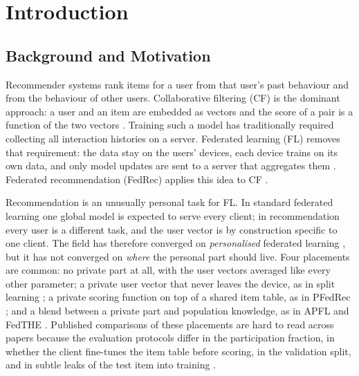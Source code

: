\chapter{Introduction}
\label{ch:introduction}

\section{Background and Motivation}
\label{sec:intro-background}

Recommender systems rank items for a user from that user's past behaviour and from the
behaviour of other users. Collaborative filtering (CF) is the dominant approach: a user and an
item are embedded as vectors and the score of a pair is a function of the two vectors
\cite{rendle2009bpr,he2017ncf}. Training such a model has traditionally required collecting all
interaction histories on a server. Federated learning (FL) removes that requirement: the data
stay on the users' devices, each device trains on its own data, and only model updates are sent
to a server that aggregates them \cite{mcmahan2017fedavg,kairouz2021advances}. Federated
recommendation (FedRec) applies this idea to CF
\cite{ammaduddin2019fcf,chai2021fedmf,zhang2025survey}.

Recommendation is an unusually personal task for FL. In standard federated learning one global
model is expected to serve every client; in recommendation every user is a different task, and
the user vector is by construction specific to one client. The field has therefore converged on
\emph{personalised} federated learning \cite{arivazhagan2019fedper,deng2020apfl,collins2021fedrep},
but it has not converged on \emph{where} the personal part should live. Four placements are
common: no private part at all, with the user vectors averaged like every other parameter; a
private user vector that never leaves the device, as in split learning
\cite{singhal2021fedrecon}; a private scoring function on top of a shared item table, as in
PFedRec \cite{zhang2023pfedrec}; and a blend between a private part and population knowledge,
as in APFL \cite{deng2020apfl} and FedTHE \cite{jiang2023fedthe}. Published comparisons of these
placements are hard to read across papers because the evaluation protocols differ in the
participation fraction, in whether the client fine-tunes the item table before scoring, in the
validation split, and in subtle leaks of the test item into training
\cite{krichene2020sampled}.

